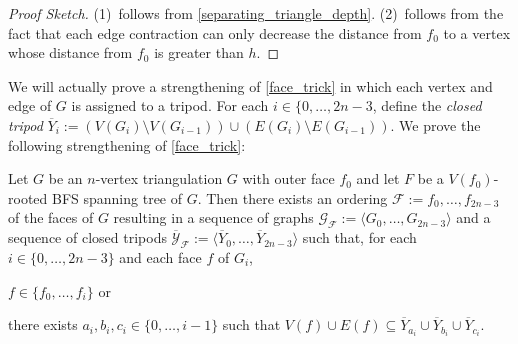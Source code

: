\documentclass{patmorin}
\begin{document}
\begin{proof}[Proof Sketch]
    (1)~follows from \cref{separating_triangle_depth}. (2)~follows from the fact that each edge contraction can only decrease the distance from $f_0$ to a vertex whose distance from $f_0$ is greater than $h$.
\end{proof}

We will actually prove a strengthening of \cref{face_trick} in which each vertex and edge of $G$ is assigned to a tripod.  For each $i\in\{0,\ldots,2n-3$, define the \emph{closed tripod} $\overline{Y}_i:=(V(G_i)\setminus V(G_{i-1}))\cup (E(G_i)\setminus E(G_{i-1}))$.  We prove the following strengthening of \cref{face_trick}:

\begin{lem}\label{face_trick2}
  Let $G$ be an $n$-vertex triangulation $G$ with outer face $f_0$ and let $F$ be a $V(f_0)$-rooted BFS spanning tree of $G$.  Then there exists an ordering $\mathcal{F}:=f_0,\ldots,f_{2n-3}$ of the faces of $G$ resulting in a sequence of graphs $\mathcal{G_F}:=\langle G_0,\ldots,G_{2n-3}\rangle$ and a sequence of closed tripods $\mathcal{\overline{Y}_F}:=\langle \overline{Y}_0,\ldots,\overline{Y}_{2n-3}\rangle$ such that, for each $i\in\{0,\ldots,2n-3\}$ and each face $f$ of $G_i$,
  \begin{compactenum}[(i)]
    \item $f\in\{f_0,\ldots,f_i\}$ or
    \item there exists $a_i,b_i,c_i\in\{0,\ldots,i-1\}$ such that $V(f)\cup E(f)\subseteq \overline{Y}_{a_i}\cup \overline{Y}_{b_i}\cup \overline{Y}_{c_i}$.
  \end{compactenum}
\end{lem}
\end{document}
